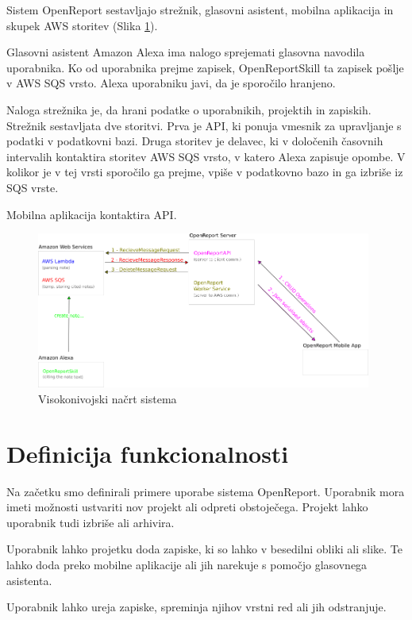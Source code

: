 \documentclass[a4paper, 12pt]{book}
\begin{document}
Sistem OpenReport sestavljajo strežnik, glasovni asistent, mobilna aplikacija in skupek AWS storitev (Slika \ref{plan}).

Glasovni asistent Amazon Alexa ima nalogo sprejemati glasovna navodila uporabnika.
Ko od uporabnika prejme zapisek, OpenReportSkill ta zapisek pošlje v AWS SQS vrsto.
Alexa uporabniku javi, da je sporočilo hranjeno.

Naloga strežnika je, da hrani podatke o uporabnikih, projektih in zapiskih.
Strežnik sestavljata dve storitvi.
Prva je API, ki ponuja vmesnik za upravljanje s podatki v podatkovni bazi.
Druga storitev je delavec, ki v določenih časovnih intervalih kontaktira storitev AWS SQS vrsto, v katero Alexa zapisuje opombe.
V kolikor je v tej vrsti sporočilo ga prejme, vpiše v podatkovno bazo in ga izbriše iz SQS vrste.

Mobilna aplikacija kontaktira API.

\begin{figure}[H]
\begin{center}
\includegraphics[width=11cm]{plan}
\end{center}
\caption{Visokonivojski načrt sistema}
\label{plan}
\end{figure}

\section{Definicija funkcionalnosti}

Na začetku smo definirali primere uporabe sistema OpenReport.
Uporabnik mora imeti možnosti ustvariti nov projekt ali odpreti obstoječega.
Projekt lahko uporabnik tudi izbriše ali arhivira.

Uporabnik lahko projetku doda zapiske, ki so lahko v besedilni obliki ali slike.
Te lahko doda preko mobilne aplikacije ali jih narekuje s pomočjo glasovnega asistenta.

Uporabnik lahko ureja zapiske, spreminja njihov vrstni red ali jih odstranjuje.
\end{document}
